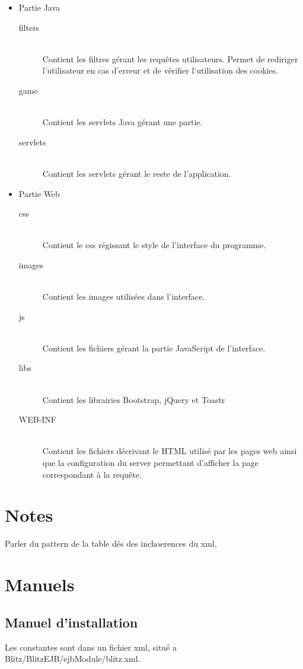 \documentclass[11pt]{scrreprt}
\begin{document}
    \begin{itemize}
        \item Partie Java
        \begin{description}
            \item[filters]\hfill \\ Contient les filtres gérant les requêtes utilisateurs. Permet de rediriger l'utilisateur en cas d'erreur et de vérifier l'utilisation des cookies.
            \item[game]\hfill \\ Contient les servlets Java gérant une partie.
            \item[servlets]\hfill \\ Contient les servlets gérant le reste de l'application.
        \end{description}
        \item Partie Web
        \begin{description}
            \item[css]\hfill \\ Contient le css régissant le style de l'interface du programme.
            \item[images]\hfill \\ Contient les images utilisées dans l'interface.
            \item[js]\hfill \\ Contient les fichiers gérant la partie JavaScript de l'interface.
            \item[libs]\hfill \\ Contient les librairies Bootstrap, jQuery et Toastr
            \item[WEB-INF]\hfill \\ Contient les fichiers décrivant le HTML utilisé par les pages web ainsi que la configuration du server permettant d'afficher la page correspondant à la requête.
        \end{description}
    \end{itemize}
    \chapter{Notes}
    Parler du pattern
    de la table dés
    des inchoerences du xml,

    \chapter{Manuels}
    \section{Manuel d'installation}
    Les constantes sont dans un fichier xml, situé a Blitz/BlitzEJB/ejbModule/blitz.xml.
\end{document}
